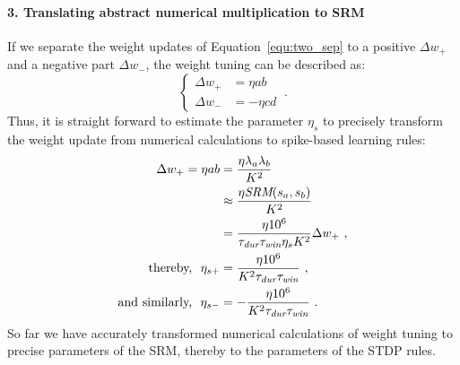 

\paragraph{3. Translating abstract numerical multiplication to SRM\\}
If we separate the weight updates of Equation~\ref{equ:two_sep} to a positive $\Delta w_+$ and a negative part $\Delta w_-$, the weight tuning can be described as:
\begin{equation}
\left\{
\begin{aligned} 
\Delta w_+ &= \eta ab\\
\Delta w_- &= -\eta cd
\end{aligned}
\right.~.
\end{equation}
Thus, it is straight forward to estimate the parameter $\eta_s$ to precisely transform the weight update from numerical calculations to spike-based learning rules:
\begin{equation}
\begin{aligned} 
\Delta w_+ = \eta ab &=\frac{\eta \lambda_a \lambda_b}{K^2}\\
&\approx \frac{\eta \textit{\textrm{SRM}}(s_a, s_b)}{K^2}\\ &=
\frac{\eta 10^6}{\tau_{\textit{\textrm{dur}}}
\tau_{\textit{\textrm{win}}}
\eta_s K^2}
\Delta w_+~,\\
\textrm{thereby,~~}
\eta_{s+} &=  \frac{\eta 10^6}{K^2 \tau_{\textit{\textrm{dur}}} \tau_{\textit{\textrm{win}}}}~,\\
\textrm{and similarly,~~}
\eta_{s-} &=  -\frac{\eta 10^6}{K^2 \tau_{\textit{\textrm{dur}}} \tau_{\textit{\textrm{win}}}}~.
\end{aligned}
\label{equ:srm}
\end{equation}
So far we have accurately transformed numerical calculations of weight tuning to precise parameters of the SRM, thereby to the parameters of the STDP rules.


